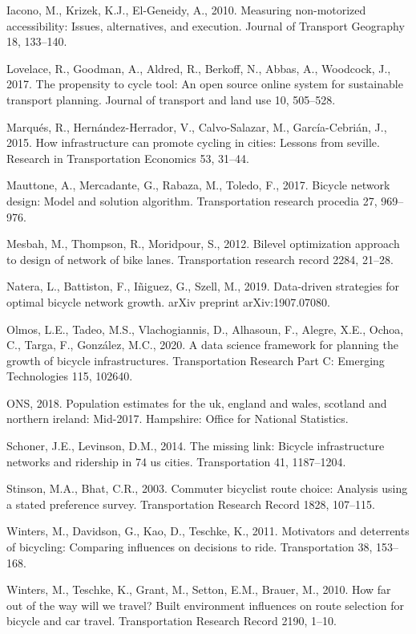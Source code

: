 \documentclass[]{elsarticle} %
\begin{document}
\leavevmode\hypertarget{ref-iacono2010measuring}{}%
Iacono, M., Krizek, K.J., El-Geneidy, A., 2010. Measuring non-motorized
accessibility: Issues, alternatives, and execution. Journal of Transport
Geography 18, 133--140.

\leavevmode\hypertarget{ref-lovelace2017propensity}{}%
Lovelace, R., Goodman, A., Aldred, R., Berkoff, N., Abbas, A., Woodcock,
J., 2017. The propensity to cycle tool: An open source online system for
sustainable transport planning. Journal of transport and land use 10,
505--528.

\leavevmode\hypertarget{ref-marques2015infrastructure}{}%
Marqués, R., Hernández-Herrador, V., Calvo-Salazar, M., García-Cebrián,
J., 2015. How infrastructure can promote cycling in cities: Lessons from
seville. Research in Transportation Economics 53, 31--44.

\leavevmode\hypertarget{ref-mauttone2017bicycle}{}%
Mauttone, A., Mercadante, G., Rabaza, M., Toledo, F., 2017. Bicycle
network design: Model and solution algorithm. Transportation research
procedia 27, 969--976.

\leavevmode\hypertarget{ref-mesbah2012bilevel}{}%
Mesbah, M., Thompson, R., Moridpour, S., 2012. Bilevel optimization
approach to design of network of bike lanes. Transportation research
record 2284, 21--28.

\leavevmode\hypertarget{ref-natera2019data}{}%
Natera, L., Battiston, F., Iñiguez, G., Szell, M., 2019. Data-driven
strategies for optimal bicycle network growth. arXiv preprint
arXiv:1907.07080.

\leavevmode\hypertarget{ref-olmos2020data}{}%
Olmos, L.E., Tadeo, M.S., Vlachogiannis, D., Alhasoun, F., Alegre, X.E.,
Ochoa, C., Targa, F., González, M.C., 2020. A data science framework for
planning the growth of bicycle infrastructures. Transportation Research
Part C: Emerging Technologies 115, 102640.

\leavevmode\hypertarget{ref-ofn2018population}{}%
ONS, 2018. Population estimates for the uk, england and wales, scotland
and northern ireland: Mid-2017. Hampshire: Office for National
Statistics.

\leavevmode\hypertarget{ref-schoner2014missing}{}%
Schoner, J.E., Levinson, D.M., 2014. The missing link: Bicycle
infrastructure networks and ridership in 74 us cities. Transportation
41, 1187--1204.

\leavevmode\hypertarget{ref-stinson2003commuter}{}%
Stinson, M.A., Bhat, C.R., 2003. Commuter bicyclist route choice:
Analysis using a stated preference survey. Transportation Research
Record 1828, 107--115.

\leavevmode\hypertarget{ref-winters2011motivators}{}%
Winters, M., Davidson, G., Kao, D., Teschke, K., 2011. Motivators and
deterrents of bicycling: Comparing influences on decisions to ride.
Transportation 38, 153--168.

\leavevmode\hypertarget{ref-winters2010far}{}%
Winters, M., Teschke, K., Grant, M., Setton, E.M., Brauer, M., 2010. How
far out of the way will we travel? Built environment influences on route
selection for bicycle and car travel. Transportation Research Record
2190, 1--10.
\end{document}
